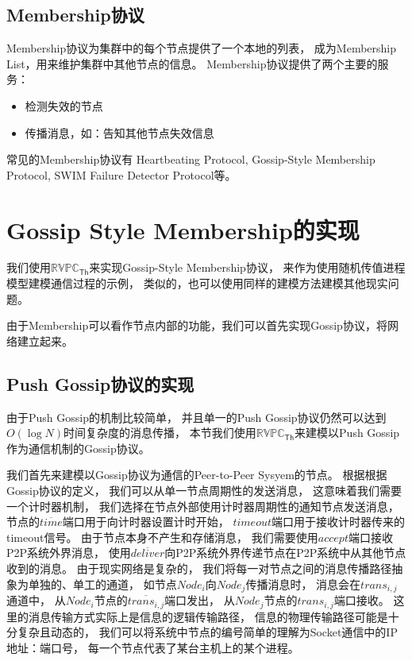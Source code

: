 \subsection{Membership协议}

Membership协议为集群中的每个节点提供了一个本地的列表，
成为Membership List，用来维护集群中其他节点的信息。
Membership协议提供了两个主要的服务：
\begin{itemize}
   \item 检测失效的节点
   \item 传播消息，如：告知其他节点失效信息
\end{itemize}

常见的Membership协议有
Heartbeating Protocol, 
Gossip-Style Membership Protocol, 
SWIM Failure Detector Protocol等。

\section{Gossip Style Membership的实现}
我们使用$\mathbb{RVPC}_{\mathsf{Th}}$来实现Gossip-Style Membership协议，
来作为使用随机传值进程模型建模通信过程的示例，
类似的，也可以使用同样的建模方法建模其他现实问题。

由于Membership可以看作节点内部的功能，我们可以首先实现Gossip协议，将网络建立起来。

\subsection{Push Gossip协议的实现}
由于Push Gossip的机制比较简单，
并且单一的Push Gossip协议仍然可以达到$O(\log N)$时间复杂度的消息传播，
本节我们使用$\mathbb{RVPC}_{\mathsf{Th}}$来建模以Push Gossip作为通信机制的Gossip协议。

我们首先来建模以Gossip协议为通信的Peer-to-Peer Sysyem的节点。
根据根据Gossip协议的定义，
我们可以从单一节点周期性的发送消息，
这意味着我们需要一个计时器机制，
我们选择在节点外部使用计时器周期性的通知节点发送消息，
节点的$\overline{time}$端口用于向计时器设置计时开始，
$timeout$端口用于接收计时器传来的timeout信号。
由于节点本身不产生和存储消息，
我们需要使用$accept$端口接收P2P系统外界消息，
使用$\overline{deliver}$向P2P系统外界传递节点在P2P系统中从其他节点收到的消息。
由于现实网络是复杂的，
我们将每一对节点之间的消息传播路径抽象为单独的、单工的通道，
如节点$Node_i$向$Node_j$传播消息时，
消息会在$trans_{i,j}$通道中，
从$Node_i$节点的$\overline{trans_{i,j}}$端口发出，
从$Node_j$节点的$trans_{i,j}$端口接收。
这里的消息传输方式实际上是信息的逻辑传输路径，
信息的物理传输路径可能是十分复杂且动态的，
我们可以将系统中节点的编号简单的理解为Socket通信中的IP地址：端口号，
每一个节点代表了某台主机上的某个进程。

